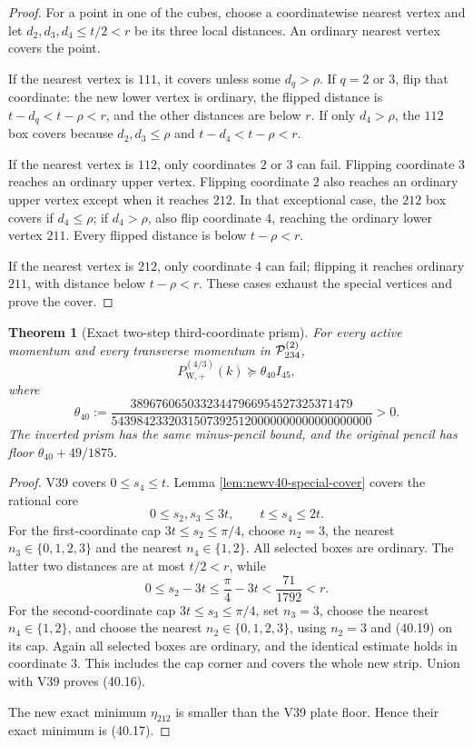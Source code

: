 \documentclass[11pt,oneside]{article}
\newtheorem{theorem}{Theorem}[section]
\theoremstyle{definition}
\theoremstyle{remark}
\begin{document}
\begin{proof}
For a point in one of the cubes, choose a coordinatewise nearest
vertex and let \(d_2,d_3,d_4\le t/2<r\) be its three local
distances.  An ordinary nearest vertex covers the point.

If the nearest vertex is \(111\), it covers unless some
\(d_q>\rho\).  If \(q=2\) or \(3\), flip that coordinate: the new
lower vertex is ordinary, the flipped distance is
\(t-d_q<t-\rho<r\), and the other distances are below \(r\).  If
only \(d_4>\rho\), the \(112\) box covers because
\(d_2,d_3\le\rho\) and \(t-d_4<t-\rho<r\).

If the nearest vertex is \(112\), only coordinates \(2\) or \(3\)
can fail.  Flipping coordinate \(3\) reaches an ordinary upper
vertex.  Flipping coordinate \(2\) also reaches an ordinary upper
vertex except when it reaches \(212\).  In that exceptional case,
the \(212\) box covers if \(d_4\le\rho\); if \(d_4>\rho\), also flip
coordinate \(4\), reaching the ordinary lower vertex \(211\).
Every flipped distance is below \(t-\rho<r\).

If the nearest vertex is \(212\), only coordinate \(4\) can fail;
flipping it reaches ordinary \(211\), with distance below
\(t-\rho<r\).  These cases exhaust the special vertices and prove
the cover.
\end{proof}

\begin{theorem}[Exact two-step third-coordinate prism]
\label{thm:newv40-widened-prism}
For every active momentum and every transverse momentum in
\({\cal P}_{234}^{(2)}\),
\[
 P_{\mathrm W,+}^{(4/3)}(k)
 \succeq\theta_{40}I_{45},                             \tag{40.16}
\]
where
\[
 \theta_{40}:=
\frac{38967606503323447966954527325371479}
{54398423320315073925120000000000000000000}>0.         \tag{40.17}
\]
The inverted prism has the same minus-pencil bound, and the
original pencil has floor \(\theta_{40}+49/1875\).
\end{theorem}

\begin{proof}
V39 covers \(0\le s_4\le t\).  Lemma
\ref{lem:newv40-special-cover} covers the rational core
\[
 0\le s_2,s_3\le3t,\qquad t\le s_4\le2t.               \tag{40.18}
\]
For the first-coordinate cap \(3t\le s_2\le\pi/4\), choose
\(n_2=3\), the nearest \(n_3\in\{0,1,2,3\}\) and the nearest
\(n_4\in\{1,2\}\).  All selected boxes are ordinary.  The latter
two distances are at most \(t/2<r\), while
\[
 0\le s_2-3t\le\frac{\pi}{4}-3t
 <\frac{71}{1792}<r.                                   \tag{40.19}
\]
For the second-coordinate cap \(3t\le s_3\le\pi/4\), set \(n_3=3\),
choose the nearest \(n_4\in\{1,2\}\), and choose the nearest
\(n_2\in\{0,1,2,3\}\), using \(n_2=3\) and (40.19) on its cap.
Again all selected boxes are ordinary, and the identical estimate
holds in coordinate \(3\).  This includes the cap corner and covers
the whole new strip.  Union with V39 proves (40.16).

The new exact minimum \(\eta_{212}\) is smaller than the V39 plate
floor.  Hence their exact minimum is (40.17).
\end{proof}
\end{document}
